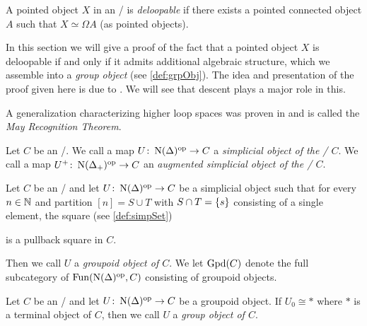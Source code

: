 A pointed object $X$ in an \inftytop/ is \emph{deloopable} if there exists a pointed connected object $A$ such that $X\simeq\Omega A$ (as pointed objects). %

In this section we will give a proof of the fact that a pointed object $X$ is deloopable if and only if it admits additional algebraic structure, which we assemble into a \emph{group object} (see \cref{def:grpObj}). %
The idea and presentation of the proof given here is due to \cite{segal_cat_and_cohom}.
We will see that descent plays a major role in this.

A generalization characterizing higher loop spaces was proven in \cite{may2006geometry} and is called the \emph{May Recognition Theorem}. %
\begin{definition}
    Let $C$ be an \inftycat/. 
    We call a map $U\colon\operatorname{N}(\Delta)^{\operatorname{op}}\to C$ a \emph{simplicial object of the \inftycat/ $C$}.
    We call a map $U^+\colon\operatorname{N}(\Delta_+)^{\operatorname{op}}\to C$ an \emph{augmented simplicial object of the \inftycat/ $C$}.
\end{definition}
\begin{definition}
    Let $C$ be an \inftycat/ and let $U\colon\operatorname{N}(\Delta)^{\operatorname{op}}\to C$ be a simplicial object such that for every $n\in\mathbb{N}$ and partition $[n]=S\cup T$ with $S\cap T=\left\lbrace s\right\rbrace$ consisting of a single element, the square (see \cref{def:simpSet})
    \begin{center}
    \end{center}
    is a pullback square in $C$.

    Then we call $U$ a \emph{groupoid object of $C$}.
    We let $\operatorname{Gpd}(C)$ denote the full subcategory of $\operatorname{Fun}(\operatorname{N}(\Delta)^{\operatorname{op}},C)$ consisting of groupoid objects.
\end{definition}
\begin{definition}\label{def:grpObj}
    Let $C$ be an \inftycat/ and let $U\colon\operatorname{N}(\Delta)^{\operatorname{op}}\to C$ be a groupoid object.
    If $U_0\cong *$ where $*$ is a terminal object of $C$, then we call $U$ a \emph{group object of $C$}.
\end{definition}
